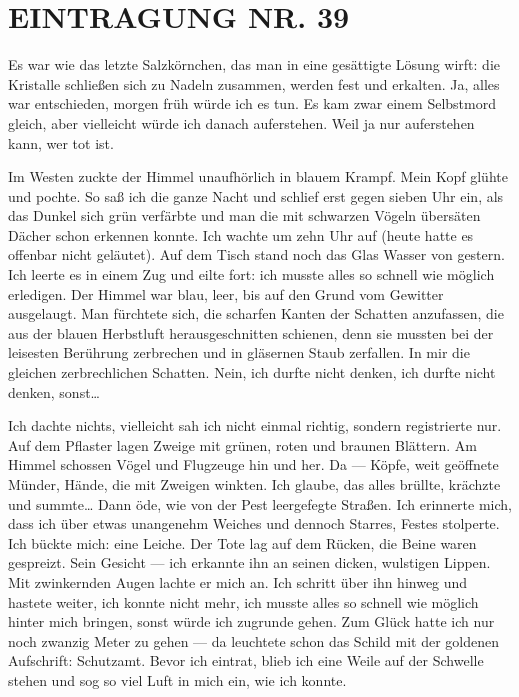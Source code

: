 \section{EINTRAGUNG NR. 39}

Es war wie das letzte Salzkörnchen, das man in eine gesättigte
Lösung wirft: die Kristalle schließen sich zu Nadeln zusammen,
werden fest und erkalten. Ja, alles war entschieden, morgen früh
würde ich es tun. Es kam zwar einem Selbstmord gleich, aber
vielleicht würde ich danach auferstehen. Weil ja nur auferstehen
kann, wer tot ist.

Im Westen zuckte der Himmel unaufhörlich in blauem Krampf. Mein
Kopf glühte und pochte. So saß ich die ganze Nacht und schlief erst
gegen sieben Uhr ein, als das Dunkel sich grün verfärbte und man
die mit schwarzen Vögeln übersäten Dächer schon erkennen konnte.
Ich wachte um zehn Uhr auf (heute hatte es offenbar nicht
geläutet). Auf dem Tisch stand noch das Glas Wasser von gestern.
Ich leerte es in einem Zug und eilte fort: ich musste alles so
schnell wie möglich erledigen. Der Himmel war blau, leer, bis auf
den Grund vom Gewitter ausgelaugt. Man fürchtete sich, die scharfen
Kanten der Schatten anzufassen, die aus der blauen Herbstluft
herausgeschnitten schienen, denn sie mussten
bei der leisesten Berührung zerbrechen und in gläsernen Staub
zerfallen. In mir die gleichen zerbrechlichen Schatten. Nein, ich
durfte nicht denken, ich durfte nicht denken, sonst\ldots{}

Ich dachte nichts, vielleicht sah ich nicht einmal richtig, sondern
registrierte nur. Auf dem Pflaster lagen Zweige mit grünen, roten
und braunen Blättern. Am Himmel schossen Vögel und Flugzeuge hin
und her. Da — Köpfe, weit geöffnete Münder, Hände, die mit Zweigen
winkten. Ich glaube, das alles brüllte, krächzte und summte\ldots{} Dann
öde, wie von der Pest leergefegte Straßen. Ich erinnerte mich, dass
ich über etwas unangenehm Weiches und dennoch Starres, Festes
stolperte. Ich bückte mich: eine Leiche. Der Tote lag auf dem
Rücken, die Beine waren gespreizt. Sein Gesicht — ich erkannte ihn
an seinen dicken, wulstigen Lippen. Mit zwinkernden Augen lachte er
mich an. Ich schritt über ihn hinweg und hastete weiter, ich konnte
nicht mehr, ich musste alles so schnell wie möglich hinter mich
bringen, sonst würde ich zugrunde gehen. Zum Glück hatte ich nur
noch zwanzig Meter zu gehen — da leuchtete schon das Schild mit der
goldenen Aufschrift: Schutzamt. Bevor ich eintrat, blieb ich eine
Weile auf der Schwelle stehen und sog so viel Luft in mich ein, wie
ich konnte.

